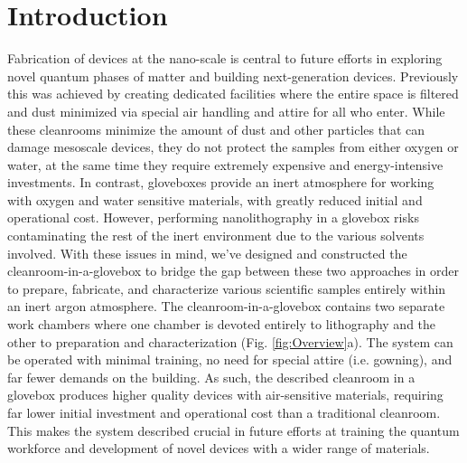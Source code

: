 \section{\label{sec:level1}Introduction}
Fabrication of devices at the nano-scale is central to future efforts in exploring novel quantum phases of matter and building next-generation devices. Previously this was achieved by creating dedicated facilities where the entire space is filtered and dust minimized via special air handling and attire for all who enter. While these cleanrooms minimize the amount of dust and other particles that can damage mesoscale devices, they do not protect the samples from either oxygen or water, at the same time they require extremely expensive and energy-intensive investments. In contrast, gloveboxes provide an inert atmosphere for working with oxygen and water sensitive materials, with greatly reduced initial and operational cost.\cite{Chae2016} However, performing nanolithography in a glovebox risks contaminating the rest of the inert environment due to the various solvents involved. With these issues in mind, we've designed and constructed the cleanroom-in-a-glovebox to bridge the gap between these two approaches in order to prepare, fabricate, and characterize various scientific samples entirely within an inert argon atmosphere. The cleanroom-in-a-glovebox contains two separate work chambers where one chamber is devoted entirely to lithography and the other to preparation and characterization (Fig. \ref{fig:Overview}a). The system can be operated with minimal training, no need for special attire (i.e. gowning), and far fewer demands on the building. As such, the described cleanroom in a glovebox produces higher quality devices with air-sensitive materials, requiring far lower initial investment and operational cost than a traditional cleanroom. This makes the system described crucial in future efforts at training the quantum workforce and development of novel devices with a wider range of materials.


